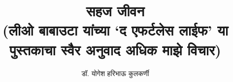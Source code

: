 
\usepackage{fontspec}
\usepackage{tikz}
\usepackage{everypage}

\setmainfont[Script=Devanagari] {Tiro Devanagari Marathi}
\newfontfamily{}
\newfontfamily{}
\graphicspath{{images/}}


\date{} %


\title{
    {\Huge \textbf{सहज जीवन}} \\ 
    \vspace{0.5em}
    {\large (लीओ बाबाउटा यांच्या `द एफर्टलेस लाईफ' या पुस्तकाचा स्वैर अनुवाद अधिक माझे विचार)}
}
\author{\textsc{डॉ. योगेश हरिभाऊ कुलकर्णी}}


\frontmatter
\maketitle


\tableofcontents

\mainmatter




